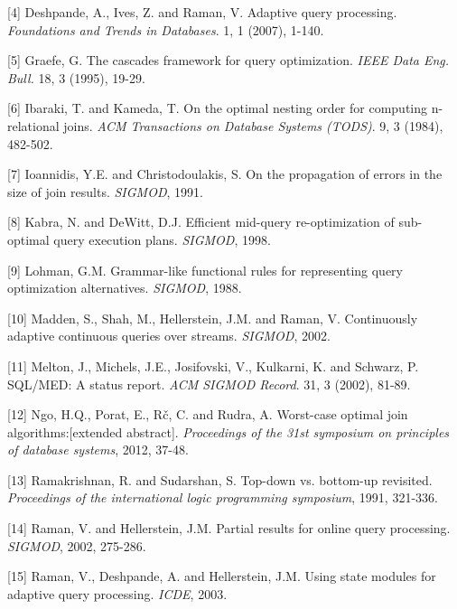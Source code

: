 \documentclass[b5paper,11pt,twoside,openright]{book}
\begin{document}
\leavevmode\hypertarget{ref-deshpande2007adaptive}{}%
{[}4{]} Deshpande, A., Ives, Z. and Raman, V. Adaptive query processing.
\emph{Foundations and Trends in Databases}. 1, 1 (2007), 1-140.

\leavevmode\hypertarget{ref-graefe1995cascades}{}%
{[}5{]} Graefe, G. The cascades framework for query optimization.
\emph{IEEE Data Eng. Bull.} 18, 3 (1995), 19-29.

\leavevmode\hypertarget{ref-ibaraki1984optimal}{}%
{[}6{]} Ibaraki, T. and Kameda, T. On the optimal nesting order for
computing n-relational joins. \emph{ACM Transactions on Database Systems
  (TODS)}. 9, 3 (1984), 482-502.

\leavevmode\hypertarget{ref-ic91}{}%
{[}7{]} Ioannidis, Y.E. and Christodoulakis, S. On the propagation of
errors in the size of join results. \emph{SIGMOD}, 1991.

\leavevmode\hypertarget{ref-kabra1998efficient}{}%
{[}8{]} Kabra, N. and DeWitt, D.J. Efficient mid-query re-optimization
of sub-optimal query execution plans. \emph{SIGMOD}, 1998.

\leavevmode\hypertarget{ref-lohman1988grammar}{}%
{[}9{]} Lohman, G.M. Grammar-like functional rules for representing
query optimization alternatives. \emph{SIGMOD}, 1988.

\leavevmode\hypertarget{ref-madden2002continuously}{}%
{[}10{]} Madden, S., Shah, M., Hellerstein, J.M. and Raman, V.
Continuously adaptive continuous queries over streams. \emph{SIGMOD},
2002.

\leavevmode\hypertarget{ref-melton2002sql}{}%
{[}11{]} Melton, J., Michels, J.E., Josifovski, V., Kulkarni, K. and
Schwarz, P. SQL/MED: A status report. \emph{ACM SIGMOD Record}. 31, 3
(2002), 81-89.

\leavevmode\hypertarget{ref-ngo2012worst}{}%
{[}12{]} Ngo, H.Q., Porat, E., Rč, C. and Rudra, A. Worst-case optimal
join algorithms:{[}extended abstract{]}. \emph{Proceedings of the 31st
  symposium on principles of database systems}, 2012, 37-48.

\leavevmode\hypertarget{ref-ramakrishnan1991top}{}%
{[}13{]} Ramakrishnan, R. and Sudarshan, S. Top-down vs. bottom-up
revisited. \emph{Proceedings of the international logic programming
  symposium}, 1991, 321-336.

\leavevmode\hypertarget{ref-raman2002partial}{}%
{[}14{]} Raman, V. and Hellerstein, J.M. Partial results for online
query processing. \emph{SIGMOD}, 2002, 275-286.

\leavevmode\hypertarget{ref-raman2003using}{}%
{[}15{]} Raman, V., Deshpande, A. and Hellerstein, J.M. Using state
modules for adaptive query processing. \emph{ICDE}, 2003.
\end{document}

